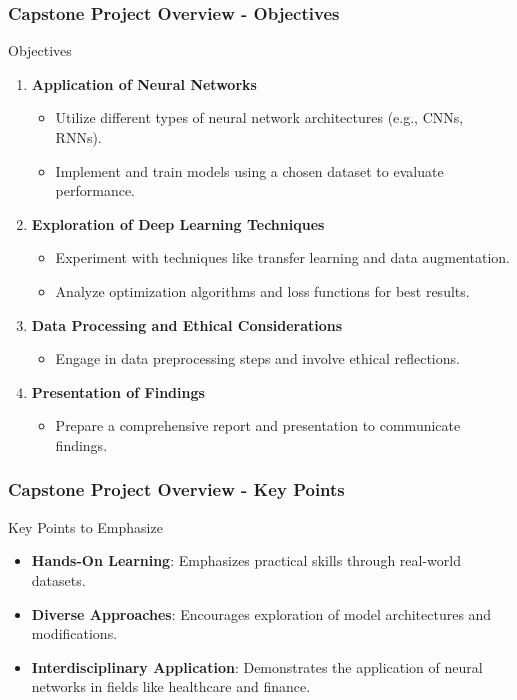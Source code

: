 \documentclass[aspectratio=169]{beamer}
\begin{document}
\begin{frame}[fragile]
    \frametitle{Capstone Project Overview - Objectives}
    \begin{block}{Objectives}
        \begin{enumerate}
            \item \textbf{Application of Neural Networks}
            \begin{itemize}
                \item Utilize different types of neural network architectures (e.g., CNNs, RNNs).
                \item Implement and train models using a chosen dataset to evaluate performance.
            \end{itemize}

            \item \textbf{Exploration of Deep Learning Techniques}
            \begin{itemize}
                \item Experiment with techniques like transfer learning and data augmentation.
                \item Analyze optimization algorithms and loss functions for best results.
            \end{itemize}

            \item \textbf{Data Processing and Ethical Considerations}
            \begin{itemize}
                \item Engage in data preprocessing steps and involve ethical reflections.
            \end{itemize}

            \item \textbf{Presentation of Findings}
            \begin{itemize}
                \item Prepare a comprehensive report and presentation to communicate findings.
            \end{itemize}
        \end{enumerate}
    \end{block}
\end{frame}

\begin{frame}[fragile]
    \frametitle{Capstone Project Overview - Key Points}
    \begin{block}{Key Points to Emphasize}
        \begin{itemize}
            \item \textbf{Hands-On Learning}: Emphasizes practical skills through real-world datasets.
            \item \textbf{Diverse Approaches}: Encourages exploration of model architectures and modifications.
            \item \textbf{Interdisciplinary Application}: Demonstrates the application of neural networks in fields like healthcare and finance.
        \end{itemize}
    \end{block}
\end{frame}
\end{document}
